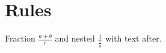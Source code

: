 \documentclass{article}
\begin{document}
\section{Rules}
Fraction $\frac{a+b}{c}$ and nested $\frac{1}{\frac{x}{y}}$ with text after.
\end{document}
